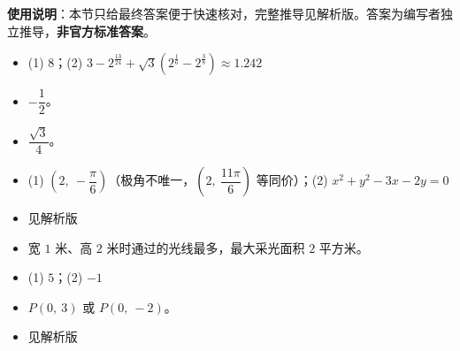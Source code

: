 
\begin{gknotice}
\textbf{使用说明}：本节只给最终答案便于快速核对，完整推导见解析版。答案为编写者独立推导，\textbf{非官方标准答案}。
\end{gknotice}

\begin{itemize}[leftmargin=2.6em]
  \item[\textbf{1.}] (1) $8$；(2) $3-2^{\frac{13}{24}}+\sqrt{3}\left(2^{\frac{1}{6}}-2^{\frac{3}{8}}\right)\approx1.242$
  \item[\textbf{2.}] $-\dfrac{1}{2}$。
  \item[\textbf{3.}] $\dfrac{\sqrt{3}}{4}$。
  \item[\textbf{4.}] (1) $\left(2,\ -\dfrac{\pi}{6}\right)$（极角不唯一，$\left(2,\ \dfrac{11\pi}{6}\right)$ 等同价）；(2) $x^{2}+y^{2}-3x-2y=0$
  \item[\textbf{5.}] 见解析版
  \item[\textbf{6.}] 宽 $1$ 米、高 $2$ 米时通过的光线最多，最大采光面积 $2$ 平方米。
  \item[\textbf{7.}] (1) $5$；(2) $-1$
  \item[\textbf{8.}] $P(0,\ 3)$ 或 $P(0,\ -2)$。
  \item[\textbf{9.}] 见解析版
\end{itemize}
